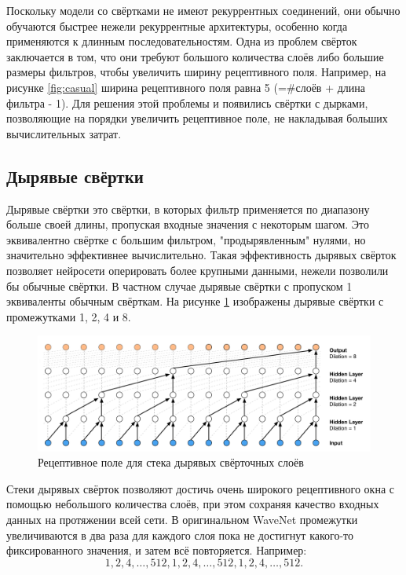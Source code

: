 \documentclass[../diploma.tex]{subfiles}
\begin{document}
Поскольку модели со свёртками не имеют рекуррентных соединений, они обычно обучаются быстрее нежели рекуррентные архитектуры, особенно когда применяются к длинным последовательностям. Одна из проблем  свёрток заключается в том, что они требуют большого количества слоёв либо большие размеры фильтров, чтобы увеличить ширину рецептивного поля. Например, на рисунке \ref{fig:casual} ширина рецептивного поля равна 5 (=\#слоёв + длина фильтра - 1). Для решения этой проблемы и появились свёртки с дырками, позволяющие на порядки увеличить рецептивное поле, не накладывая больших вычислительных затрат. 

\newpage
\subsection{Дырявые свёртки}

Дырявые свёртки это свёртки, в которых фильтр применяется по диапазону больше своей длины, пропуская входные значения с некоторым шагом. Это эквивалентно свёртке с большим фильтром, "продырявленным" нулями, но значительно эффективнее вычислительно. Такая эффективность дырявых свёрток позволяет нейросети оперировать более крупными данными, нежели позволили бы обычные свёртки. В частном случае дырявые свёртки с пропуском 1 эквиваленты обычным свёрткам. На рисунке \ref{fig:casual_dilated} изображены дырявые свёртки с промежутками 1, 2, 4 и 8. 

\begin{figure}[h!]
  \centering
  \includegraphics[scale=0.32]{img/casual_dilated}
  \caption{Рецептивное поле для стека дырявых свёрточных слоёв}
  \label{fig:casual_dilated}
\end{figure}

Стеки дырявых свёрток позволяют достичь очень широкого рецептивного окна с помощью небольшого количества слоёв, при этом сохраняя качество входных данных на протяжении всей сети. В оригинальном WaveNet промежутки увеличиваются в два раза для каждого слоя пока не достигнут какого-то фиксированного значения, и затем всё повторяется. Например:
$$1,2,4,\dots, 512, 1,2,4,\dots, 512, 1,2,4,\dots, 512.$$ 
\end{document}
